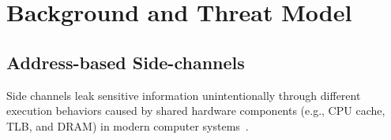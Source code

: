 \section{Background and Threat Model}

\subsection{Address-based Side-channels}
Side channels leak sensitive information
unintentionally through different execution behaviors caused by shared 
hardware components (e.g., CPU cache, TLB, and
DRAM) in modern computer systems~\cite{ge2018survey,szefer2019survey,191010,184415,Osvik2006,liu2015last,184415}. 


